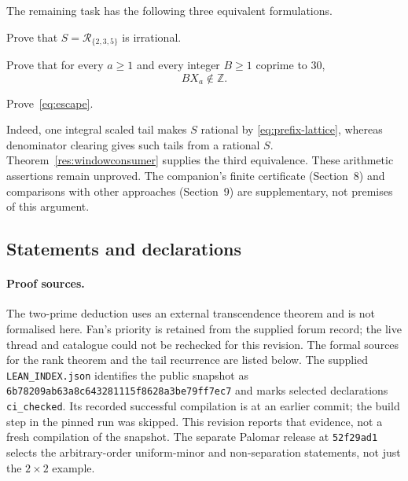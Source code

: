 \documentclass[11pt]{article}
\begin{document}
The remaining task has the following three equivalent formulations.
\begin{problem}
Prove that $S=\mathcal R_{\{2,3,5\}}$ is irrational.
\end{problem}
\begin{problem}\label{prob:tails269}
Prove that for every $a\ge1$ and every integer $B\ge1$ coprime to $30$,
\begin{equation}\label{eq:tail-nonintegrality}
 BX_a\notin\mathbb Z.
\end{equation}
\end{problem}
\begin{problem}\label{prob:producer}
Prove~\eqref{eq:escape}.
\end{problem}
Indeed, one integral scaled tail makes $S$ rational by
\eqref{eq:prefix-lattice}, whereas denominator clearing gives such tails
from a rational $S$.  Theorem~\ref{res:windowconsumer} supplies the third
equivalence.  These arithmetic assertions remain unproved.  The companion's finite
certificate (Section~8) and comparisons with other approaches
(Section~9) are supplementary, not premises of this argument.

\subsection*{Statements and declarations}
\paragraph{Proof sources.}
The two-prime deduction uses an external transcendence theorem and is not
formalised here.  Fan's priority is retained from the supplied forum record; the live
thread and catalogue could not be rechecked for this revision.
The formal sources for the rank theorem and the tail recurrence are
listed below.  The supplied \texttt{LEAN\_INDEX.json}
identifies the public snapshot as
\nolinkurl{6b78209ab63a8c643281115f8628a3be79ff7ec7} and marks selected
declarations \texttt{ci\_checked}.  Its recorded successful compilation is
at an earlier commit; the build step in the pinned run was skipped.
This revision reports that evidence, not a fresh compilation of the
snapshot.  The separate Palomar release at \texttt{52f29ad1} selects the
arbitrary-order uniform-minor and non-separation statements, not just the
$2\times2$ example.
\end{document}
